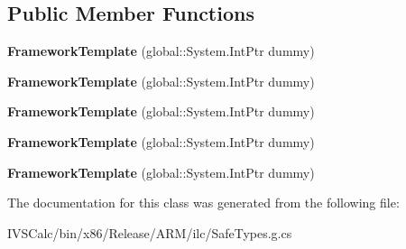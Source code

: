 \subsection*{Public Member Functions}
\begin{DoxyCompactItemize}
\item 
\mbox{\label{class_windows_1_1_u_i_1_1_xaml_1_1_framework_template_a61714124c669d59e5d1a5eff6f37e36f}} 
{\bfseries Framework\+Template} (global\+::\+System.\+Int\+Ptr dummy)
\item 
\mbox{\label{class_windows_1_1_u_i_1_1_xaml_1_1_framework_template_a61714124c669d59e5d1a5eff6f37e36f}} 
{\bfseries Framework\+Template} (global\+::\+System.\+Int\+Ptr dummy)
\item 
\mbox{\label{class_windows_1_1_u_i_1_1_xaml_1_1_framework_template_a61714124c669d59e5d1a5eff6f37e36f}} 
{\bfseries Framework\+Template} (global\+::\+System.\+Int\+Ptr dummy)
\item 
\mbox{\label{class_windows_1_1_u_i_1_1_xaml_1_1_framework_template_a61714124c669d59e5d1a5eff6f37e36f}} 
{\bfseries Framework\+Template} (global\+::\+System.\+Int\+Ptr dummy)
\item 
\mbox{\label{class_windows_1_1_u_i_1_1_xaml_1_1_framework_template_a61714124c669d59e5d1a5eff6f37e36f}} 
{\bfseries Framework\+Template} (global\+::\+System.\+Int\+Ptr dummy)
\end{DoxyCompactItemize}


The documentation for this class was generated from the following file\+:\begin{DoxyCompactItemize}
\item 
I\+V\+S\+Calc/bin/x86/\+Release/\+A\+R\+M/ilc/Safe\+Types.\+g.\+cs\end{DoxyCompactItemize}

